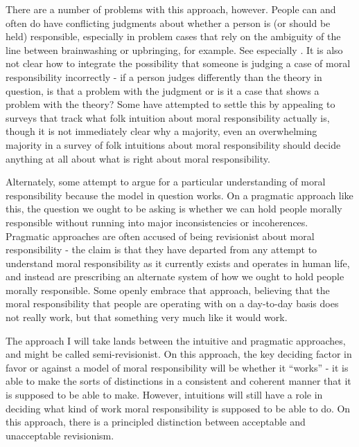 \documentclass[phd,12pt,oneside,paper=letterpaper]{ubcthesis}
\begin{document}
There are a number of problems with this approach, however. People can and often do have conflicting judgments about whether a person is (or should be held) responsible, especially in problem cases that rely on the ambiguity of the line between brainwashing or upbringing, for example. See especially \citep[p.110-7]{pereboom2001}. It is also not clear how to integrate the possibility that someone is judging a case of moral responsibility incorrectly - if a person judges differently than the theory in question, is that a problem with the judgment or is it a case that shows a problem with the theory? Some \citep{nahmias2004} have attempted to settle this by appealing to surveys that track what folk intuition about moral responsibility actually is, though it is not immediately clear why a majority, even an overwhelming majority in a survey of folk intuitions about moral responsibility should decide anything at all about what is right about moral responsibility.  

Alternately, some attempt to argue for a particular understanding of moral responsibility because the model in question works. On a pragmatic approach like this, the question we ought to be asking is whether we can hold people morally responsible without running into major inconsistencies or incoherences. Pragmatic approaches are often accused of being revisionist about moral responsibility - the claim is that they have departed from any attempt to understand moral responsibility as it currently exists and operates in human life, and instead are prescribing an alternate system of how we ought to hold people morally responsible. Some \citep{vargas2009, fischerravizza1998} openly embrace that approach, believing that the moral responsibility that people are operating with on a day-to-day basis does not really work, but that something very much like it would work. 

The approach I will take lands between the intuitive and pragmatic approaches, and might be called semi-revisionist. On this approach, the key deciding factor in favor or against a model of moral responsibility will be whether it ``works''  - it is able to make the sorts of distinctions in a consistent and coherent manner that it is supposed to be able to make. However, intuitions will still have a role in deciding what kind of work moral responsibility is supposed to be able to do. On this approach, there is a principled distinction between acceptable and unacceptable revisionism.
\end{document}
